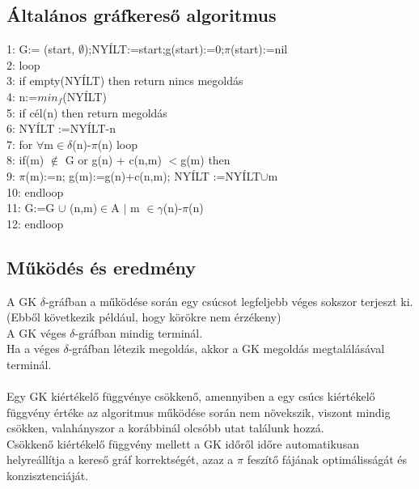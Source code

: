 \documentclass{article}
\begin{document}
	 \subsection{Általános gráfkereső algoritmus}
	 1: G:= ({start}, $\emptyset$);NYÍLT:={start};g(start):=0;$\pi$(start):=nil\\
	 2: loop\\
	 3: \hspace{1em} if empty(NYÍLT) then return nincs megoldás\\
	 4: \hspace{1em} n:=$min_f$(NYÍLT) \\
	 5: \hspace{1em} if cél(n) then return megoldás\\
	 6: \hspace{1em} NYÍLT :=NYÍLT-{n}\\
	 7: \hspace{1em} for $\forall$m$\in$$\delta$(n)-$\pi$(n) loop\\
	 8: \hspace{2em} if(m) $\notin$ G or g(n) + c(n,m) $<$g(m) then\\
	 9: \hspace{3em} $\pi$(m):=n; g(m):=g(n)+c(n,m); NYÍLT :=NYÍLT$\cup${m}\\
	 10:\hspace{1em} endloop\\
	 11:\hspace{1em} G:=G $\cup$ {(n,m)$\in$A $|$ m $\in$$\gamma$(n)-$\pi$(n)}\\
	 12: endloop
	 
	 \newpage
	 \subsection{Működés és eredmény}
	 A GK $\delta$-gráfban a működése során egy csúcsot legfeljebb véges sokszor terjeszt ki. (Ebből következik például, hogy körökre nem érzékeny)\\
	 A GK véges $\delta$-gráfban mindig terminál.\\
	 Ha a véges $\delta$-gráfban létezik megoldás, akkor a GK megoldás megtalálásával terminál.\\ \\
	 Egy GK kiértékelő függvénye csökkenő, amennyiben a egy csúcs kiértékelő függvény értéke az algoritmus működése során nem növekszik, viszont mindig csökken, valahányszor a korábbinál olcsóbb utat találunk hozzá. \\
	 Csökkenő kiértékelő függvény mellett a GK időről időre automatikusan helyreállítja a kereső gráf korrektségét, azaz a $\pi$ feszítő fájának optimálisságát és konzisztenciáját.\\
	 
\end{document}
